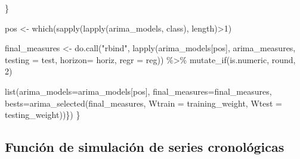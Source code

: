 \documentclass[
]{article}
\newenvironment{Shaded}{\begin{snugshade}}{\end{snugshade}}
\newcommand{\AttributeTok}[1]{\textcolor[rgb]{0.77,0.63,0.00}{#1}}
\newcommand{\DecValTok}[1]{\textcolor[rgb]{0.00,0.00,0.81}{#1}}
\newcommand{\FunctionTok}[1]{\textcolor[rgb]{0.00,0.00,0.00}{#1}}
\newcommand{\NormalTok}[1]{#1}
\newcommand{\OtherTok}[1]{\textcolor[rgb]{0.56,0.35,0.01}{#1}}
\newcommand{\SpecialCharTok}[1]{\textcolor[rgb]{0.00,0.00,0.00}{#1}}
\newcommand{\StringTok}[1]{\textcolor[rgb]{0.31,0.60,0.02}{#1}}
\begin{document}
\begin{Shaded}
\begin{Highlighting}[]
\NormalTok{        \}}
        

\NormalTok{        pos }\OtherTok{\textless{}{-}} \FunctionTok{which}\NormalTok{(}\FunctionTok{sapply}\NormalTok{(}\FunctionTok{lapply}\NormalTok{(arima\_models, class), length)}\SpecialCharTok{\textgreater{}}\DecValTok{1}\NormalTok{)}
        

\NormalTok{        final\_measures }\OtherTok{\textless{}{-}} \FunctionTok{do.call}\NormalTok{(}\StringTok{"rbind"}\NormalTok{, }\FunctionTok{lapply}\NormalTok{(arima\_models[pos], }
\NormalTok{                                                  arima\_measures, }
                                                  \AttributeTok{testing =}\NormalTok{ test, }
                                                  \AttributeTok{horizon=}\NormalTok{ horiz, }
                                                  \AttributeTok{regr =}\NormalTok{ reg)) }\SpecialCharTok{\%\textgreater{}\%} 
            \FunctionTok{mutate\_if}\NormalTok{(is.numeric, round, }\DecValTok{2}\NormalTok{)}

        \FunctionTok{list}\NormalTok{(}\AttributeTok{arima\_models=}\NormalTok{arima\_models[pos], }
             \AttributeTok{final\_measures=}\NormalTok{final\_measures, }
             \AttributeTok{bests=}\FunctionTok{arima\_selected}\NormalTok{(final\_measures, }
                                  \AttributeTok{Wtrain =}\NormalTok{ training\_weight, }
                                  \AttributeTok{Wtest =}\NormalTok{ testing\_weight))\})}
\NormalTok{\}}
\end{Highlighting}
\end{Shaded}

\subsection{Función de simulación de series cronológicas}

\label{simula_series}
\end{document}
